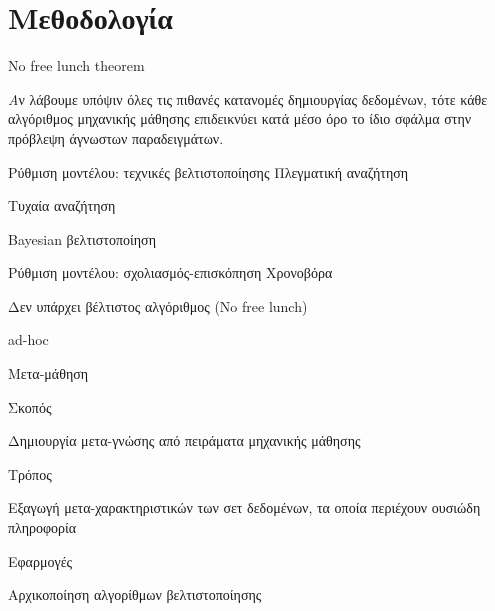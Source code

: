 \documentclass{beamer}
\begin{document}
  \section{Μεθοδολογία}
  \begin{frame} {No free lunch theorem}
  	\begin{flushleft}
  		{\small \textit 
  	    Αν λάβουμε υπόψιν όλες τις πιθανές κατανομές δημιουργίας δεδομένων, τότε κάθε αλγόριθμος μηχανικής μάθησης επιδεικνύει κατά μέσο όρο το ίδιο σφάλμα στην πρόβλεψη άγνωστων παραδειγμάτων.}
  	\end{flushleft}
  \end{frame}
    \begin{frame} {Ρύθμιση μοντέλου: τεχνικές βελτιστοποίησης}    	
    	Πλεγματική αναζήτηση
    	
    	Τυχαία αναζήτηση
    	
    	Bayesian βελτιστοποίηση    	
    \end{frame}
    \begin{frame} {Ρύθμιση μοντέλου: σχολιασμός-επισκόπηση}
    Χρονοβόρα
    
    Δεν υπάρχει βέλτιστος αλγόριθμος (No free lunch)
    
    ad-hoc
    \end{frame}
  \begin{frame}{Μετα-μάθηση}
  	\begin{minipage}[t]{.3\textwidth}  		
  		Σκοπός
  		\vspace{4ex}
  	\end{minipage}%
  	\begin{minipage}[t]{.6\textwidth}
  		Δημιουργία μετα-γνώσης από πειράματα μηχανικής μάθησης  	
  		\vspace{4ex}
  	\end{minipage}
  	\begin{minipage}[t]{.3\textwidth}  		
  		Τρόπος
  		\vspace{4ex}
  	\end{minipage}%
  	\begin{minipage}[t]{.6\textwidth}
  		Εξαγωγή μετα-χαρακτηριστικών των σετ δεδομένων, τα οποία περιέχουν ουσιώδη πληροφορία
  		\vspace{4ex} 
  	\end{minipage}
  	\begin{minipage}[t]{.3\textwidth}  		
  		Εφαρμογές
  		\vspace{4ex}
  	\end{minipage}%
  	\begin{minipage}[t]{.6\textwidth}
  		Αρχικοποίηση αλγορίθμων βελτιστοποίησης
  		\vspace{4ex}
  	\end{minipage}
  \end{frame}
\end{document}

